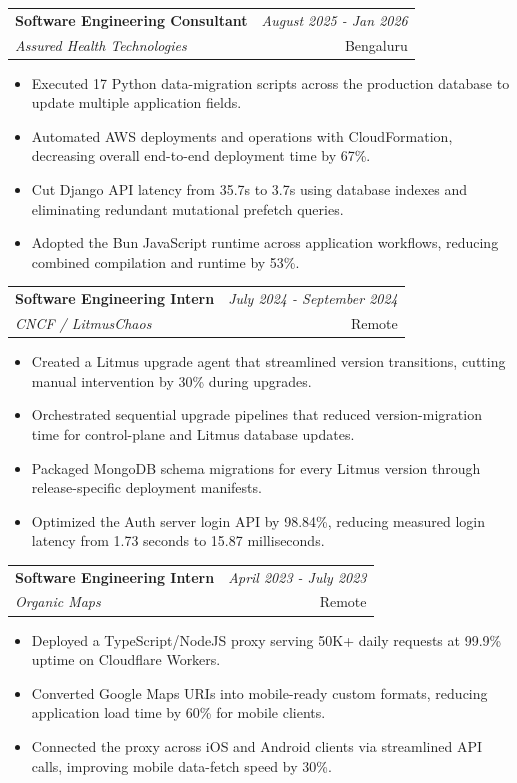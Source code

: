 \documentclass[a4paper,11pt]{article}
\makeatletter
\newcommand{\resumeSubheading}[4]{
\vspace{0.5mm}\item
    \begin{tabular*}{0.98\textwidth}[t]{l@{\extracolsep{\fill}}r}
        \textbf{#1} & \textit{\footnotesize{#4}} \\
        \textit{\footnotesize{#3}} &  \footnotesize{#2}\\
    \end{tabular*}
    \vspace{-2.4mm}
}
\newcommand{\resumeItemListStart}{\begin{justify}\begin{itemize}[leftmargin=3ex, rightmargin=2ex, noitemsep,labelsep=1.2mm,itemsep=0mm]\small}
\newcommand{\resumeItemListEnd}{\end{itemize}\end{justify}\vspace{-2mm}}
\makeatother
\begin{document}
\vspace{-2mm}
\resumeSubheading
{ Software Engineering Consultant}{Bengaluru}
{Assured Health Technologies}{August 2025 - Jan 2026}
\resumeItemListStart
\item {Executed 17 Python data-migration scripts across the production database to update multiple application fields.}
\item {Automated AWS deployments and operations with CloudFormation, decreasing overall end-to-end deployment time by 67\%.}
\item {Cut Django API latency from 35.7s to 3.7s using database indexes and eliminating redundant mutational prefetch queries.}
\item {Adopted the Bun JavaScript runtime across application workflows, reducing combined compilation and runtime by 53\%.}
\resumeItemListEnd

\vspace{-2mm}
\resumeSubheading
{ Software Engineering Intern}{Remote}
{CNCF / LitmusChaos}{July 2024 - September 2024}
\resumeItemListStart
\item {Created a Litmus upgrade agent that streamlined version transitions, cutting manual intervention by 30\% during upgrades.}
\item {Orchestrated sequential upgrade pipelines that reduced version-migration time for control-plane and Litmus database updates.}
\item {Packaged MongoDB schema migrations for every Litmus version through release-specific deployment manifests.}
\item {Optimized the Auth server login API by 98.84\%, reducing measured login latency from 1.73 seconds to 15.87 milliseconds.}
\resumeItemListEnd


\vspace{-2.0mm}

\resumeSubheading
{ Software Engineering Intern}{Remote}
{Organic Maps}{April 2023 - July 2023}
\resumeItemListStart
\item {Deployed a TypeScript/NodeJS proxy serving 50K+ daily requests at 99.9\% uptime on Cloudflare Workers.}
\item {Converted Google Maps URIs into mobile-ready custom formats, reducing application load time by 60\% for mobile clients.}
\item {Connected the proxy across iOS and Android clients via streamlined API calls, improving mobile data-fetch speed by 30\%.}
\resumeItemListEnd
    
\end{document}
